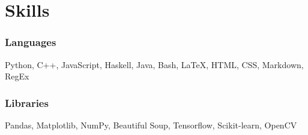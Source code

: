 \documentclass{article}
\makeatletter
\newcommand{\smallbullet}{\,\begin{picture}(-1,1)(-1,-3)\circle*{3}\end{picture}\ }
\newenvironment{resumeItem}
{
    \vspace{0.5em}
}
{
}
\newcommand{\experienceHead}[4]{
    \textbf{#1} @ #2 \hfill #3 \\[-1.2em]
}
\newenvironment{resumeList}
{
    \begin{itemize}[label=\smallbullet]
}
{
    \end{itemize}
}
\makeatother
\begin{document}




\section{Skills}

\begin{resumeItem}
\subsubsection{Languages}
Python, C++, JavaScript, Haskell, Java, Bash, {\LaTeX}, HTML, CSS, Markdown, RegEx

\subsubsection{Libraries}
Pandas, Matplotlib, NumPy, Beautiful Soup, Tensorflow, Scikit-learn, OpenCV
\end{resumeItem}
\end{document}
